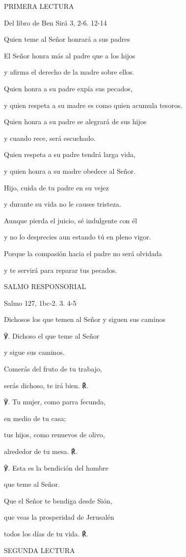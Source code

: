 PRIMERA LECTURA

Del libro de Ben Sirá 3, 2-6. 12-14

Quien teme al Señor honrará a sus padres

El Señor honra más al padre que a los hijos

y afirma el derecho de la madre sobre ellos.

Quien honra a su padre expía sus pecados,

y quien respeta a su madre es como quien acumula tesoros.

Quien honra a su padre se alegrará de sus hijos

y cuando rece, será escuchado.

Quien respeta a su padre tendrá larga vida,

y quien honra a su madre obedece al Señor.

Hijo, cuida de tu padre en su vejez

y durante su vida no le causes tristeza.

Aunque pierda el juicio, sé indulgente con él

y no lo desprecies aun estando tú en pleno vigor.

Porque la compasión hacia el padre no será olvidada

y te servirá para reparar tus pecados.

SALMO RESPONSORIAL

Salmo 127, 1bc-2. 3. 4-5

Dichosos los que temen al Señor y siguen sus caminos

℣. Dichoso el que teme al Señor

y sigue sus caminos.

Comerás del fruto de tu trabajo,

serás dichoso, te irá bien. ℟.

℣. Tu mujer, como parra fecunda,

en medio de tu casa;

tus hijos, como renuevos de olivo,

alrededor de tu mesa. ℟.

℣. Esta es la bendición del hombre

que teme al Señor.

Que el Señor te bendiga desde Sión,

que veas la prosperidad de Jerusalén

todos los días de tu vida. ℟.

SEGUNDA LECTURA

